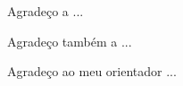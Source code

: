 
\begin{agradecimentos} %

  Agradeço a ...

  Agradeço também a ...

  Agradeço ao meu orientador ... 

\end{agradecimentos}


